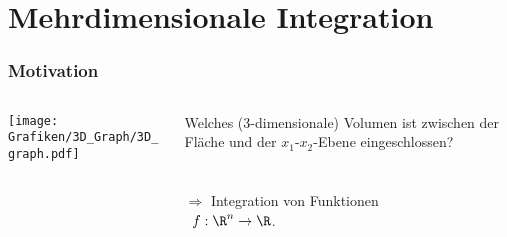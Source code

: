 \section{Mehrdimensionale Integration}
\makeSectionDividerPage
\begin{frame}\frametitle{Motivation}
\begin{columns}[T] %
\begin{column}{.48\textwidth}
		\begin{center}
			\texttt{[image: Grafiken/3D\_Graph/3D\_graph.pdf]}
		\end{center}
\end{column}%
\hfill%
\begin{column}{.48\textwidth}
Welches (3-dimensionale) Volumen ist zwischen der Fläche und der $x_1$-$x_2$-Ebene eingeschlossen? \\\pause \quad\\\quad\\
$\Rightarrow$ Integration von Funktionen\\ \quad \ $f:\R^n \to \R$.
\end{column}%
\end{columns}

\end{frame}
%
